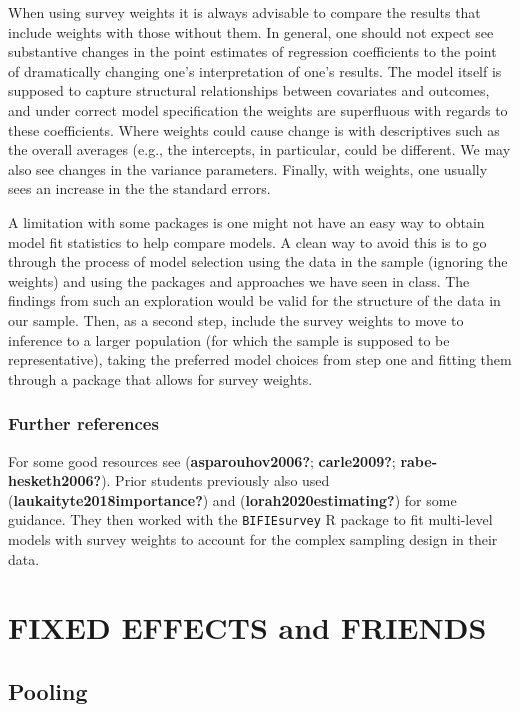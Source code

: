 \documentclass[
  letterpaper,
  DIV=11,
  numbers=noendperiod]{scrreprt}
\begin{document}
When using survey weights it is always advisable to compare the results
that include weights with those without them. In general, one should not
expect see substantive changes in the point estimates of regression
coefficients to the point of dramatically changing one's interpretation
of one's results. The model itself is supposed to capture structural
relationships between covariates and outcomes, and under correct model
specification the weights are superfluous with regards to these
coefficients. Where weights could cause change is with descriptives such
as the overall averages (e.g., the intercepts, in particular, could be
different. We may also see changes in the variance parameters. Finally,
with weights, one usually sees an increase in the the standard errors.

A limitation with some packages is one might not have an easy way to
obtain model fit statistics to help compare models. A clean way to avoid
this is to go through the process of model selection using the data in
the sample (ignoring the weights) and using the packages and approaches
we have seen in class. The findings from such an exploration would be
valid for the structure of the data in our sample. Then, as a second
step, include the survey weights to move to inference to a larger
population (for which the sample is supposed to be representative),
taking the preferred model choices from step one and fitting them
through a package that allows for survey weights.

\hypertarget{further-references}{%
\section{Further references}\label{further-references}}

For some good resources see (\textbf{asparouhov2006?};
\textbf{carle2009?}; \textbf{rabe-hesketh2006?}). Prior students
previously also used (\textbf{laukaityte2018importance?}) and
(\textbf{lorah2020estimating?}) for some guidance. They then worked with
the \texttt{BIFIEsurvey} R package to fit multi-level models with survey
weights to account for the complex sampling design in their data.

\part{FIXED EFFECTS and FRIENDS}

\hypertarget{pooling}{%
\chapter{Pooling}\label{pooling}}
\end{document}
